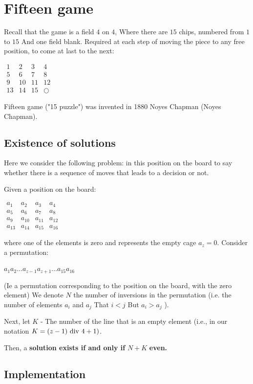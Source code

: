 \section{ Fifteen game }
Recall that the game is a field $4$ on $4$, Where there are $15$ chips, numbered from $1$ to $15$ And one field blank. Required at each step of moving the piece to any free position, to come at last to the next:

$\begin{array}{cccc}
1 & 2 & 3 & 4\\
5 & 6 & 7 & 8\\
9 & 10 & 11 & 12\\
13 & 14 & 15 & \bigcirc
\end{array}$

Fifteen game ("15 puzzle") was invented in 1880 Noyes Chapman (Noyes Chapman).

\subsection{ Existence of solutions }

Here we consider the following problem: in this position on the board to say whether there is a sequence of moves that leads to a decision or not.

Given a position on the board:

$\begin{array}{cccc}
a_{1} & a_{2} & a_{3} & a_{4}\\
a_{5} & a_{6} & a_{7} & a_{8}\\
a_{9} & a_{10} & a_{11} & a_{12}\\
a_{13} & a_{14} & a_{15} & a_{16}
\end{array}$

where one of the elements is zero and represents the empty cage $a_z = 0$.
Consider a permutation:

$a_{1}a_{2}\ldots a_{z-1}a_{z+1}\ldots a_{15}a_{16}$

(Ie a permutation corresponding to the position on the board, with the zero element)
We denote $N$ the number of inversions in the permutation (i.e. the number of elements $a_i$ and $a_j$ That $i <j$ But $a_i> a_j$ ).

Next, let $K$ - The number of the line that is an empty element (i.e., in our notation $K = (z-1)\ {\rm div}\ 4 + 1)$.

Then, a \textbf{solution exists if and only if} \textbf{$N + K$} \textbf{even.}

\subsection{ Implementation }

